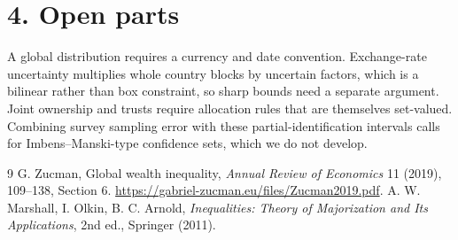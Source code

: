 \documentclass[11pt]{article}
\theoremstyle{definition}
\begin{document}
\section*{4. Open parts}
A global distribution requires a currency and date convention. Exchange-rate uncertainty multiplies whole country blocks
by uncertain factors, which is a bilinear rather than box constraint, so sharp bounds need a separate argument. Joint
ownership and trusts require allocation rules that are themselves set-valued. Combining survey sampling error with these
partial-identification intervals calls for Imbens--Manski-type confidence sets, which we do not develop.

\begin{thebibliography}{9}
 G. Zucman, Global wealth inequality, \emph{Annual Review of Economics} 11 (2019), 109--138, Section 6.
\url{https://gabriel-zucman.eu/files/Zucman2019.pdf}.
 A. W. Marshall, I. Olkin, B. C. Arnold, \emph{Inequalities: Theory of Majorization and Its Applications}, 2nd ed., Springer (2011).
\end{thebibliography}
\end{document}
